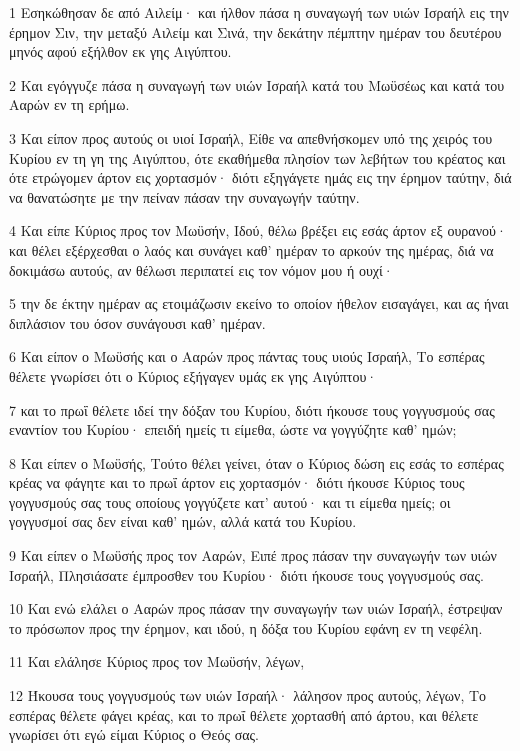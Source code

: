 \par 1 Εσηκώθησαν δε από Αιλείμ· και ήλθον πάσα η συναγωγή των υιών Ισραήλ εις την έρημον Σιν, την μεταξύ Αιλείμ και Σινά, την δεκάτην πέμπτην ημέραν του δευτέρου μηνός αφού εξήλθον εκ γης Αιγύπτου.
\par 2 Και εγόγγυζε πάσα η συναγωγή των υιών Ισραήλ κατά του Μωϋσέως και κατά του Ααρών εν τη ερήμω.
\par 3 Και είπον προς αυτούς οι υιοί Ισραήλ, Είθε να απεθνήσκομεν υπό της χειρός του Κυρίου εν τη γη της Αιγύπτου, ότε εκαθήμεθα πλησίον των λεβήτων του κρέατος και ότε ετρώγομεν άρτον εις χορτασμόν· διότι εξηγάγετε ημάς εις την έρημον ταύτην, διά να θανατώσητε με την πείναν πάσαν την συναγωγήν ταύτην.
\par 4 Και είπε Κύριος προς τον Μωϋσήν, Ιδού, θέλω βρέξει εις εσάς άρτον εξ ουρανού· και θέλει εξέρχεσθαι ο λαός και συνάγει καθ' ημέραν το αρκούν της ημέρας, διά να δοκιμάσω αυτούς, αν θέλωσι περιπατεί εις τον νόμον μου ή ουχί·
\par 5 την δε έκτην ημέραν ας ετοιμάζωσιν εκείνο το οποίον ήθελον εισαγάγει, και ας ήναι διπλάσιον του όσον συνάγουσι καθ' ημέραν.
\par 6 Και είπον ο Μωϋσής και ο Ααρών προς πάντας τους υιούς Ισραήλ, Το εσπέρας θέλετε γνωρίσει ότι ο Κύριος εξήγαγεν υμάς εκ γης Αιγύπτου·
\par 7 και το πρωΐ θέλετε ιδεί την δόξαν του Κυρίου, διότι ήκουσε τους γογγυσμούς σας εναντίον του Κυρίου· επειδή ημείς τι είμεθα, ώστε να γογγύζητε καθ' ημών;
\par 8 Και είπεν ο Μωϋσής, Τούτο θέλει γείνει, όταν ο Κύριος δώση εις εσάς το εσπέρας κρέας να φάγητε και το πρωΐ άρτον εις χορτασμόν· διότι ήκουσε Κύριος τους γογγυσμούς σας τους οποίους γογγύζετε κατ' αυτού· και τι είμεθα ημείς; οι γογγυσμοί σας δεν είναι καθ' ημών, αλλά κατά του Κυρίου.
\par 9 Και είπεν ο Μωϋσής προς τον Ααρών, Ειπέ προς πάσαν την συναγωγήν των υιών Ισραήλ, Πλησιάσατε έμπροσθεν του Κυρίου· διότι ήκουσε τους γογγυσμούς σας.
\par 10 Και ενώ ελάλει ο Ααρών προς πάσαν την συναγωγήν των υιών Ισραήλ, έστρεψαν το πρόσωπον προς την έρημον, και ιδού, η δόξα του Κυρίου εφάνη εν τη νεφέλη.
\par 11 Και ελάλησε Κύριος προς τον Μωϋσήν, λέγων,
\par 12 Ήκουσα τους γογγυσμούς των υιών Ισραήλ· λάλησον προς αυτούς, λέγων, Το εσπέρας θέλετε φάγει κρέας, και το πρωΐ θέλετε χορτασθή από άρτου, και θέλετε γνωρίσει ότι εγώ είμαι Κύριος ο Θεός σας.
